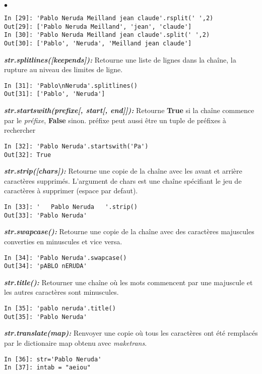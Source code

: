 \documentclass[10pt,dvipsnames,  dvips]{article}
\begin{document}
\begin{list}{$\bullet$}{}
\begin{lstlisting}
In [29]: 'Pablo Neruda Meilland jean claude'.rsplit(' ',2)
Out[29]: ['Pablo Neruda Meilland', 'jean', 'claude']
In [30]: 'Pablo Neruda Meilland jean claude'.split(' ',2)
Out[30]: ['Pablo', 'Neruda', 'Meilland jean claude']
\end{lstlisting}
\item \textit{\textbf{str.splitlines([keepends]): }} Retourne une liste de lignes dans la chaîne, la rupture au niveau des limites de ligne.
\begin{lstlisting}
In [31]: 'Pablo\nNeruda'.splitlines()
Out[31]: ['Pablo', 'Neruda']
\end{lstlisting}
\item \textit{\textbf{ str.startswith(prefixe[, start[, end]]): }} Retourne \textbf{True} si la chaîne commence par le \textit{préfixe},   \textbf{False} sinon. préfixe peut aussi être un tuple de préfixes à rechercher
\begin{lstlisting}
In [32]: 'Pablo Neruda'.startswith('Pa')
Out[32]: True
\end{lstlisting}
\item \textit{\textbf{str.strip([chars]): }} Retourne une copie de la chaîne avec les avant et arrière caractères supprimés. L'argument de chars est une chaîne spécifiant le jeu de caractères à supprimer (espace par defaut).
\begin{lstlisting}
In [33]: '   Pablo Neruda   '.strip()
Out[33]: 'Pablo Neruda'
\end{lstlisting}
\item \textit{\textbf{str.swapcase(): }} Retourne une copie de la chaîne avec des caractères majuscules converties en minuscules et vice versa.
\begin{lstlisting}
In [34]: 'Pablo Neruda'.swapcase()
Out[34]: 'pABLO nERUDA'
\end{lstlisting}
\item \textit{\textbf{str.title(): }} Retourner une chaîne où les mots commencent par une majuscule et les autres caractères sont minuscules.
\begin{lstlisting}
In [35]: 'pablo neruda'.title()
Out[35]: 'Pablo Neruda'
\end{lstlisting}
\item \textit{\textbf{str.translate(map): }} Renvoyer une copie où tous les caractères ont été remplacés par le dictionaire map obtenu avec \textit{maketrans}.
\begin{lstlisting}
In [36]: str='Pablo Neruda'
In [37]: intab = "aeiou"

\end{lstlisting}
\end{list}
\end{document}
